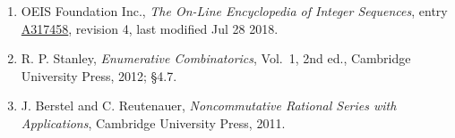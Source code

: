 \documentclass[11pt]{article}
\theoremstyle{definition}
\begin{document}
\begin{enumerate}

\item OEIS Foundation Inc., \emph{The On-Line Encyclopedia of Integer Sequences}, entry \href{https://oeis.org/A317458}{A317458}, revision 4, last modified Jul 28 2018.

\item R. P. Stanley, \emph{Enumerative Combinatorics}, Vol.~1, 2nd ed., Cambridge University Press, 2012; \S4.7.

\item J. Berstel and C. Reutenauer, \emph{Noncommutative Rational Series with Applications}, Cambridge University Press, 2011.

\end{enumerate}
\end{document}
